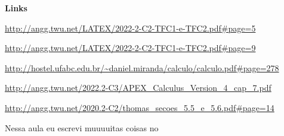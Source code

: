 \documentclass[oneside,12pt]{article}
\begin{document}


{\bf Links}

{\scriptsize

\url{http://angg.twu.net/LATEX/2022-2-C2-TFC1-e-TFC2.pdf#page=5}

\url{http://angg.twu.net/LATEX/2022-2-C2-TFC1-e-TFC2.pdf#page=9}

\url{http://hostel.ufabc.edu.br/~daniel.miranda/calculo/calculo.pdf\#page=278}

\url{http://angg.twu.net/2022.2-C3/APEX_Calculus_Version_4_cap_7.pdf}

\url{http://angg.twu.net/2020.2-C2/thomas_secoes_5.5_e_5.6.pdf\#page=14}

}


\bsk

Nessa aula eu escrevi muuuuitas coisas no
\end{document}
